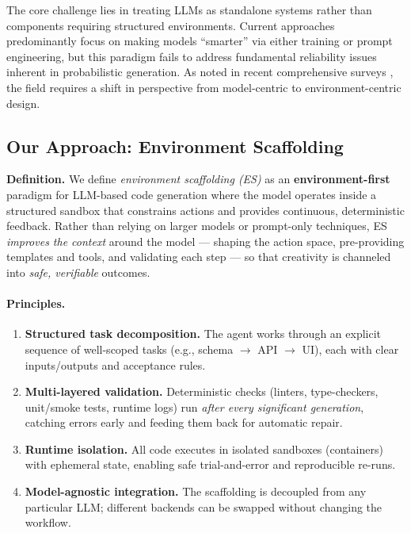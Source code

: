 \documentclass{article}
\begin{document}
The core challenge lies in treating LLMs as standalone systems rather than components requiring structured environments. Current approaches predominantly focus on making models ``smarter'' via either training or prompt engineering, but this paradigm fails to address fundamental reliability issues inherent in probabilistic generation. As noted in recent comprehensive surveys \citep{jiang2024survey,paul2024benchmarks}, the field requires a shift in perspective from model-centric to environment-centric design.

\subsection{Our Approach: Environment Scaffolding}

\textbf{Definition.} We define \emph{environment scaffolding (ES)} as an \textbf{environment-first} paradigm for LLM-based code generation where the model operates inside a structured sandbox that constrains actions and provides continuous, deterministic feedback. Rather than relying on larger models or prompt-only techniques, ES \emph{improves the context} around the model --- shaping the action space, pre-providing templates and tools, and validating each step --- so that creativity is channeled into \emph{safe, verifiable} outcomes.

\paragraph{Principles.}
\begin{enumerate}
  \item \textbf{Structured task decomposition.} The agent works through an explicit sequence of well-scoped tasks (e.g., schema $\rightarrow$ API $\rightarrow$ UI), each with clear inputs/outputs and acceptance rules.
  \item \textbf{Multi-layered validation.} Deterministic checks (linters, type-checkers, unit/smoke tests, runtime logs) run \emph{after every significant generation}, catching errors early and feeding them back for automatic repair.
  \item \textbf{Runtime isolation.} All code executes in isolated sandboxes (containers) with ephemeral state, enabling safe trial-and-error and reproducible re-runs.
  \item \textbf{Model-agnostic integration.} The scaffolding is decoupled from any particular LLM; different backends can be swapped without changing the workflow.
\end{enumerate}
\end{document}
